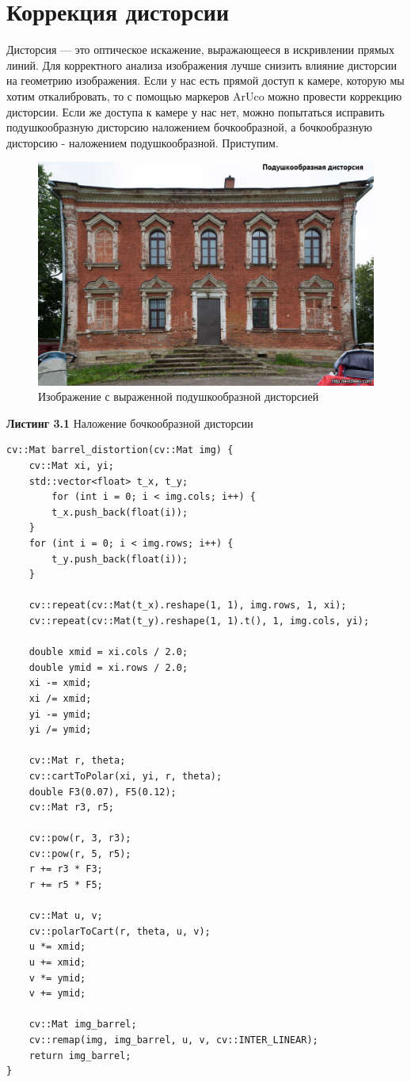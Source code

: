 \section{Коррекция дисторсии}
\noindent  Дисторсия — это оптическое искажение, выражающееся в искривлении прямых линий. 
Для корректного анализа изображения лучше снизить влияние дисторсии на геометрию изображения. Если у нас есть прямой доступ к камере, которую мы хотим откалибровать, то с помощью маркеров ArUco можно провести коррекцию дисторсии.
Если же доступа к камере у нас нет, можно попытаться исправить подушкообразную дисторсию наложением бочкообразной, а бочкообразную дисторсию - наложением подушкообразной. 
Приступим.\\
\begin{figure}[h]
    \centering 
    \includegraphics[scale=0.4]{../images/original/pd.jpg}
    \caption{Изображение с выраженной подушкообразной дисторсией}
\end{figure}

\clearpage
\noindent \textbf{Листинг 3.1} Наложение бочкообразной дисторсии
\begin{lstlisting}
cv::Mat barrel_distortion(cv::Mat img) {
    cv::Mat xi, yi;
    std::vector<float> t_x, t_y;
        for (int i = 0; i < img.cols; i++) {
        t_x.push_back(float(i));
    }
    for (int i = 0; i < img.rows; i++) {
        t_y.push_back(float(i));
    }
    
    cv::repeat(cv::Mat(t_x).reshape(1, 1), img.rows, 1, xi);
    cv::repeat(cv::Mat(t_y).reshape(1, 1).t(), 1, img.cols, yi);
    
    double xmid = xi.cols / 2.0;
    double ymid = xi.rows / 2.0;
    xi -= xmid;
    xi /= xmid;
    yi -= ymid;
    yi /= ymid;
    
    cv::Mat r, theta;
    cv::cartToPolar(xi, yi, r, theta);
    double F3(0.07), F5(0.12);
    cv::Mat r3, r5;
    
    cv::pow(r, 3, r3);
    cv::pow(r, 5, r5);
    r += r3 * F3;
    r += r5 * F5;
    
    cv::Mat u, v;
    cv::polarToCart(r, theta, u, v);
    u *= xmid;
    u += xmid;
    v *= ymid;
    v += ymid;
    
    cv::Mat img_barrel;
    cv::remap(img, img_barrel, u, v, cv::INTER_LINEAR);
    return img_barrel;
}
\end{lstlisting}

